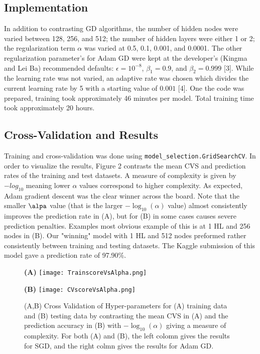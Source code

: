\documentclass{article}
\begin{document}
\subsection{Implementation}
In addition to contrasting GD algorithms, the number of hidden nodes were varied between 128, 256, and 512; the number of hidden layers were either 1 or 2; the regularization term $\alpha$ was varied at 0.5, 0.1, 0.001, and 0.0001. The other regularization parameter's for Adam GD were kept at the developer's (Kingma and Lei Ba) recommended defaults: $\epsilon = 10^{-8}$, $\beta_1=0.9$, and $\beta_2=0.999$ [3]. While the learning rate was not varied, an adaptive rate was chosen which divides the current learning rate by 5 with a starting value of $0.001$ [4]. One the code was prepared, training took approximately 46 minutes per model. Total training time took approximately 20 hours.

\subsection{Cross-Validation and Results}
Training and cross-validation was done using \verb+model_selection.GridSearchCV+. In order to visualize the results, Figure 2 contrasts the mean CVS and prediction rates of the training and test datasets. A measure of complexity is given by $-log_{10}$ meaning lower $\alpha$ values correspond to higher complexity. As expected, Adam gradient descent was the clear winner across the board. Note that the smaller $\alpa$ value (that is the larger $-\log_{10}(\alpha)$ value) almost consistently improves the prediction rate in (A), but for (B) in some cases causes severe prediction penalties. Examples most obvious example of this is at 1 HL and 256 nodes in (B). Our "winning" model with 1 HL and 512 nodes preformed rather consistently between training and testing datasets. The Kaggle submission of this model gave a prediction rate of 97.90\%.

\begin{figure}[h]
    \centering
    \begin{minipage}[t]{0.45\textwidth}
        \centering
        \textbf{(A)}
        \texttt{[image: TrainscoreVsAlpha.png]}
    \end{minipage}
    \begin{minipage}[t]{0.45\textwidth}
        \centering
        \textbf{(B)}
        \texttt{[image: CVscoreVsAlpha.png]}
    \end{minipage}
\caption{(A,B) Cross Validation of Hyper-parameters for (A) training data and (B) testing data by contrasting the mean CVS in (A) and the prediction accuracy in (B) with $-\log_{10}(\alpha)$ giving a measure of complexity. For both (A) and (B), the left colomn gives the results for SGD, and the right colmn gives the results for Adam GD.}
\end{figure}
\end{document}
